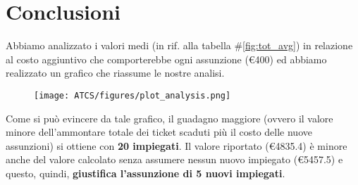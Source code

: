 \documentclass[../Relazione.tex]{subfiles}
\begin{document}
\section{Conclusioni}
    Abbiamo analizzato i valori medi (in rif. alla tabella \#\ref{fig:tot_avg}) in relazione al costo aggiuntivo che comporterebbe ogni assunzione (\euro400) ed abbiamo realizzato un grafico che riassume le nostre analisi.
    \vspace{0.5cm}
    \begin{figure}[!h]
        \centering
        \texttt{[image: ATCS/figures/plot\_analysis.png]}
        \label{fig:plot_anal}
    \end{figure}
    
    Come si può evincere da tale grafico, il guadagno maggiore (ovvero il valore minore dell'ammontare totale dei ticket scaduti più il costo delle nuove assunzioni) si ottiene con \textbf{20 impiegati}. Il valore riportato (\euro4835.4) è minore anche del valore calcolato senza assumere nessun nuovo impiegato (\euro5457.5) e questo, quindi, \textbf{giustifica l'assunzione di 5 nuovi impiegati}.
         
\end{document}
